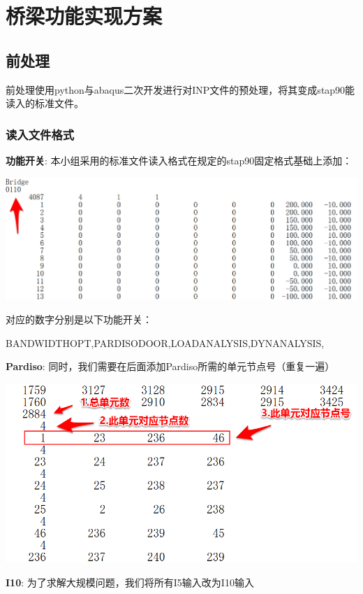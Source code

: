 \documentclass[UTF8]{ctexbook}
\begin{document}
\section{桥梁功能实现方案}
\subsection{前处理}

前处理使用python与abaqus二次开发进行对INP文件的预处理，将其变成stap90能读入的标准文件。

\subsubsection{读入文件格式}
\textbf{功能开关}: 本小组采用的标准文件读入格式在规定的stap90固定格式基础上添加：
\begin{center}
\includegraphics[width=\textwidth]{pre01.png}
\end{center}

对应的数字分别是以下功能开关：

BANDWIDTHOPT,PARDISODOOR,LOADANALYSIS,DYNANALYSIS,

\textbf{Pardiso}: 同时，我们需要在后面添加Pardiso所需的单元节点号（重复一遍）
\begin{center}
\includegraphics[width=\textwidth]{pre02.png}
\end{center}

\textbf{I10}: 为了求解大规模问题，我们将所有I5输入改为I10输入
\end{document}
